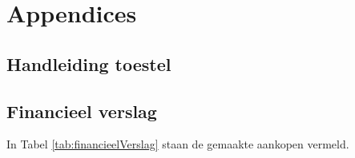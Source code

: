 \documentclass[a4paper,twoside,kulak]{kulakreport} %
\begin{document}
\clearpage
\nocite{wikipedia,LabX}



\chapter*{Appendices}

\section*{Handleiding toestel}

\section*{Financieel verslag}
\label{Appendix: Financieel verslag}

In Tabel \ref{tab:financieelVerslag} staan de gemaakte aankopen vermeld. 




		
\end{document}
